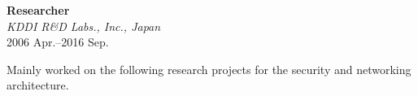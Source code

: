 
\textbf{Researcher}\\
\hspace*{4ex}\textit{KDDI R\&D Labs.\@, Inc., Japan}\\
\hspace*{4ex}2006 Apr.--2016 Sep.

\hspace*{4ex}Mainly worked on the following research projects for the security and networking architecture.


